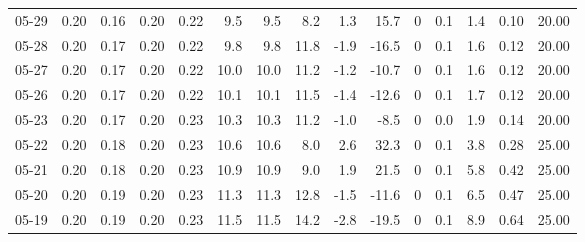 \begin{threeparttable}
{\begin{tabular}{lrrrrrrrrrrrrrr}
  05-29 &          0.20 &          0.16 &          0.20 &        0.22 &                 9.5 &                9.5 &                 8.2 &        1.3 &         15.7 &              0 &                 0.1 &              1.4 &            0.10 &                  20.00 \\
  05-28 &          0.20 &          0.17 &          0.20 &        0.22 &                 9.8 &                9.8 &                11.8 &       -1.9 &        -16.5 &              0 &                 0.1 &              1.6 &            0.12 &                  20.00 \\
  05-27 &          0.20 &          0.17 &          0.20 &        0.22 &                10.0 &               10.0 &                11.2 &       -1.2 &        -10.7 &              0 &                 0.1 &              1.6 &            0.12 &                  20.00 \\
  05-26 &          0.20 &          0.17 &          0.20 &        0.22 &                10.1 &               10.1 &                11.5 &       -1.4 &        -12.6 &              0 &                 0.1 &              1.7 &            0.12 &                  20.00 \\
  05-23 &          0.20 &          0.17 &          0.20 &        0.23 &                10.3 &               10.3 &                11.2 &       -1.0 &         -8.5 &              0 &                 0.0 &              1.9 &            0.14 &                  20.00 \\
  05-22 &          0.20 &          0.18 &          0.20 &        0.23 &                10.6 &               10.6 &                 8.0 &        2.6 &         32.3 &              0 &                 0.1 &              3.8 &            0.28 &                  25.00 \\
  05-21 &          0.20 &          0.18 &          0.20 &        0.23 &                10.9 &               10.9 &                 9.0 &        1.9 &         21.5 &              0 &                 0.1 &              5.8 &            0.42 &                  25.00 \\
  05-20 &          0.20 &          0.19 &          0.20 &        0.23 &                11.3 &               11.3 &                12.8 &       -1.5 &        -11.6 &              0 &                 0.1 &              6.5 &            0.47 &                  25.00 \\
  05-19 &          0.20 &          0.19 &          0.20 &        0.23 &                11.5 &               11.5 &                14.2 &       -2.8 &        -19.5 &              0 &                 0.1 &              8.9 &            0.64 &                  25.00 \\

\end{tabular}}
\end{threeparttable}
